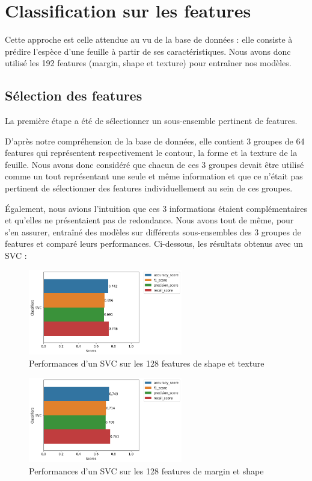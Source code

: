 \documentclass{article}
\begin{document}
\newpage
\section{Classification sur les features}
Cette approche est celle attendue au vu de la base de données : elle consiste à prédire l'espèce
d'une feuille à partir de ses caractéristiques. Nous avons donc utilisé les 192 features
(margin, shape et texture) pour entraîner nos modèles.

\subsection{Sélection des features}
La première étape a été de sélectionner un sous-ensemble pertinent de features. 

D'après notre
compréhension de la base de données, elle contient 3 groupes de 64 features qui représentent
respectivement le contour, la forme et la texture de la feuille. Nous avons donc considéré
que chacun de ces 3 groupes devait être utilisé comme un tout représentant
une seule et même information et que ce n'était pas pertinent
de sélectionner des features individuellement au sein de ces groupes.

Également, nous avions l'intuition que ces 3 informations étaient complémentaires et qu'elles
ne présentaient pas de redondance. Nous avons tout de même, pour s'en assurer, entraîné des
modèles sur différents sous-ensembles des 3 groupes de features et comparé leurs performances. 
Ci-dessous, les résultats obtenus avec un SVC \cite{SVC} :

\begin{figure}[h]
    \centering
    \includegraphics[width=0.6\textwidth]{img/svc_perfs_without_margin.png}
    \caption{Performances d'un SVC sur les 128 features de shape et texture}
\end{figure}

\begin{figure}[h]
    \centering
    \includegraphics[width=0.6\textwidth]{img/svc_perfs_without_texture.png}
    \caption{Performances d'un SVC sur les 128 features de margin et shape}
\end{figure}
\end{document}
